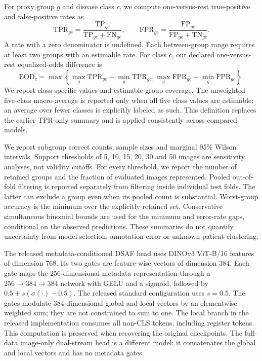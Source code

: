For proxy group $g$ and disease class $c$, we compute one-versus-rest
true-positive and false-positive rates as
\begin{equation}
\mathrm{TPR}_{gc}=\frac{\mathrm{TP}_{gc}}{\mathrm{TP}_{gc}+\mathrm{FN}_{gc}},
\qquad
\mathrm{FPR}_{gc}=\frac{\mathrm{FP}_{gc}}{\mathrm{FP}_{gc}+\mathrm{TN}_{gc}}.
\end{equation}
A rate with a zero denominator is undefined. Each between-group range requires
at least two groups with an estimable rate. For class $c$, our declared
one-versus-rest equalized-odds difference is
\begin{equation}
\mathrm{EOD}_{c}=\max\left\{
\max_g\mathrm{TPR}_{gc}-\min_g\mathrm{TPR}_{gc},
\max_g\mathrm{FPR}_{gc}-\min_g\mathrm{FPR}_{gc}\right\}.
\end{equation}
We report class-specific values and estimable group coverage. The unweighted
five-class macro-average is reported only when all five class values are
estimable; an average over fewer classes is explicitly labeled as such. This
definition replaces the earlier TPR-only summary and is applied consistently
across compared models.

We report subgroup correct counts, sample sizes and marginal 95\% Wilson
intervals. Support thresholds of 5, 10, 15, 20, 30 and 50 images are sensitivity
analyses, not validity cutoffs. For every threshold, we report the number of
retained groups and the fraction of evaluated images represented. Pooled
out-of-fold filtering is reported separately from filtering inside individual
test folds. The latter can exclude a group even when its pooled count is
substantial. Worst-group accuracy is the minimum over the explicitly retained
set. Conservative simultaneous binomial bounds are used for the minimum and
error-rate gaps, conditional on the observed predictions. These summaries do
not quantify uncertainty from model selection, annotation error or unknown
patient clustering.

The released metadata-conditioned DSAF head uses DINOv3 ViT-B/16 features of
dimension 768. Its two gates are feature-wise vectors of dimension 384. Each
gate maps the 256-dimensional metadata representation through a
$256\!\rightarrow\!384\!\rightarrow\!384$ network with GELU and a sigmoid,
followed by $0.5+s(\sigma(\cdot)-0.5)$. The released standard configuration uses
$s=0.5$. The gates modulate 384-dimensional global and local vectors by an
elementwise weighted sum; they are not constrained to sum to one. The local
branch in the released implementation consumes all non-CLS tokens, including
register tokens. This computation is preserved when recovering the original
checkpoints. The full-data image-only dual-stream head is a different model:
it concatenates the global and local vectors and has no metadata gates.

